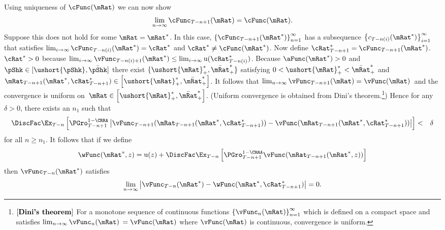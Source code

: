 \documentclass[titlepage]{\econtex}\providecommand{\texname}{BufferStockTheory}%
\begin{document}
Using uniqueness of $\cFunc(\mRat)$ we can now show
\begin{equation}
\lim_{n\rightarrow \infty }\cFunc_{T-n+1}(\mRat) =\cFunc(\mRat).
\end{equation}
Suppose this does not hold for some $\mRat=\mRat^{*}$. In this case, $ \left\{
  \cFunc_{T-n+1}(\mRat^{*})\right\} _{n=1}^{\infty }$ has a subsequence $
\left\{ c_{T-n(i)}(\mRat^{*})\right\} _{i=1}^{\infty }$ that satisfies $
\lim_{i\rightarrow \infty }\cFunc_{T-n(i)}(\mRat^{*})=\cRat^{*}$ and $\cRat^{*}\neq
\cFunc(\mRat^{*})$. Now define $\cRat^{*} _{T-n+1}=\cFunc_{T-n+1}(\mRat^{*})$.  $\cRat^{*}>0$
because $\lim_{ i\rightarrow \infty }\vFunc_{T-n(i)+1}(\mRat^{*})\leq \lim_{
  i\rightarrow \infty }\util(\cRat^{*}_{T-n(i)})$. Because $\aFunc(\mRat^{*})>0$ and
$\pShk \in [\ushort{\pShk},\bar{\pShk}]$ there exist $\{
\ushort{\mRat}_{+}^{*},\bar{\mRat}_{+}^{*}\} $ satisfying $0<
\ushort{\mRat}_{+}^{*}<\bar{\mRat}_{+}^{*}$ and ${\mRat}_{T-n+1}( \mRat^{*},\cRat^{*}
_{T-n+1}) \in \left[ \ushort{\mRat}_{+}^{*},\bar{\mRat}_{+}^{*}\right]$.
It follows that $\lim_{n\rightarrow \infty }\vFunc_{T-n+1}(\mRat)=\vFunc(\mRat)$~and the
convergence is uniform on~$\mRat\in
\left[\ushort{\mRat}_{+}^{*},\bar{\mRat}_{+}^{*}\right]$. (Uniform
convergence is obtained from Dini's theorem.\footnote{$\left[
    \text{\textbf{Dini's theorem}}\right] $ For a monotone sequence of
  continuous functions $\left\{ \vFunc_{n}(\mRat)\right\} _{n=1}^{\infty }$
  which is defined on a compact space and satisfies
  $\lim_{n\rightarrow\infty }\vFunc_{n}(\mRat)$ $=\vFunc(\mRat)$ where $\vFunc(\mRat)$ is
  continuous, convergence is uniform.}) Hence for any $\delta >0$,
there exists an $n_{1}$ such that
\begin{eqnarray*}
\DiscFac \Ex_{T-n}\left[ {\PGro}_{T-n+1}^{1-\CRRA }\left\vert
\vFunc_{T-n+1}( {\mRat}_{T-n+1}( \mRat^{*},\cRat^{*}
_{T-n+1}) ) -\vFunc( {\mRat}_{T-n+1}( \mRat^{*},
\cRat^{*}_{T-n+1}) ) \right\vert \right]  &<&\delta \notag
\end{eqnarray*}
for all $n\geq n_{1}$. It follows that if we define
\begin{equation}
\wFunc( \mRat^{*},z) =\util(z)+\DiscFac \Ex_{T-n}\left[ {\PGro}_{T-n+1}^{1-\CRRA }\vFunc( {\mRat}_{T-n+1}( \mRat^{*}
,z) ) \right]
\end{equation}
then $\vFunc_{T-n}(\mRat^{*})$ satisfies
\begin{equation}
\lim_{n\rightarrow \infty }\left\vert \vFunc_{T-n}(\mRat^{*}
)-\wFunc( \mRat^{*},\cRat^{*}_{T-n+1}) \right\vert =0.
\label{Inequality1}
\end{equation}
\end{document}
